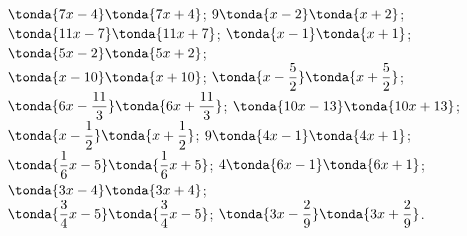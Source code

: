 \begin{esercizio}
 \(\tonda{7 x - 4} \tonda{7 x + 4}\); \quad 
{} \(9 \tonda{x - 2} \tonda{x + 2}\); \quad \\
 \(\tonda{11 x - 7} \tonda{11 x + 7}\); \quad 
{} \(\tonda{x - 1} \tonda{x + 1}\); \quad 
{} \(\tonda{5 x - 2} \tonda{5 x + 2}\); \quad \\
 \(\tonda{x - 10} \tonda{x + 10}\); \quad 
{} \(\tonda{x - \dfrac{5}{2}} \tonda{x + \dfrac{5}{2}}\); \quad 
{} \(\tonda{6x -\dfrac{11}{3}} \tonda{6x +\dfrac{11}{3}}\); \quad 
{} \(\tonda{10 x - 13} \tonda{10 x + 13}\); \quad 
{} \(\tonda{x -\dfrac{1}{2}} \tonda{x +\dfrac{1}{2}}\); \quad 
{} \(9 \tonda{4 x - 1} \tonda{4 x + 1}\); \quad \\
 \(\tonda{\dfrac{1}{6}x - 5} \tonda{\dfrac{1}{6}x + 5}\); \quad 
{} \(4 \tonda{6 x - 1} \tonda{6 x + 1}\); \quad 
{} \(\tonda{3x - 4} \tonda{3x + 4}\); \quad \\
 \(\tonda{\dfrac{3}{4}x - 5} \tonda{\dfrac{3}{4}x - 5}\); \quad 
{} \(\tonda{3x - \dfrac{2}{9}} \tonda{3x + \dfrac{2}{9}}\).
\end{esercizio}

\pagebreak %

\subsubsection*{}


